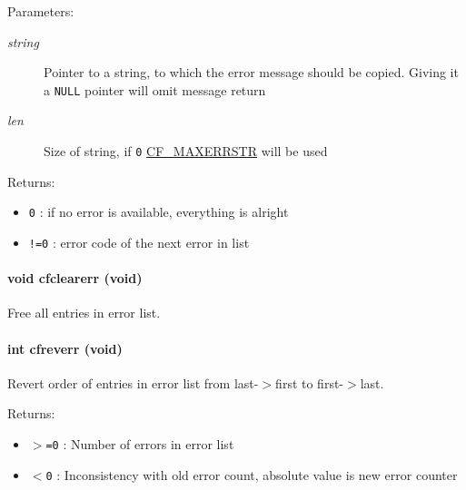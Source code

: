 \begin{Desc}
\item[Parameters:]
\begin{description}
\item[{\em string}]Pointer to a string, to which the error message should be copied. Giving it a {\tt NULL} pointer will omit message return\item[{\em len}]Size of string, if {\tt 0} \hyperlink{group__cflib__core_gf78e4b950c9aa49b752e4460342ea3bf}{CF\_\-MAXERRSTR} will be used\end{description}
\end{Desc}
\begin{Desc}
\item[Returns:]\begin{itemize}
\item {\tt 0} : if no error is available, everything is alright \item {\tt !=0} : error code of the next error in list \end{itemize}
\end{Desc}
\hypertarget{group__errors_gad0c79adfdf363a11532dc4039136ec6}{
\paragraph[{cfclearerr}]{\setlength{\rightskip}{0pt plus 5cm}void cfclearerr (void)}\hfill}
\label{group__errors_gad0c79adfdf363a11532dc4039136ec6}


Free all entries in error list. 

\hypertarget{group__errors_gbc3a143038fbcabc944d224e20ca50f8}{
\paragraph[{cfreverr}]{\setlength{\rightskip}{0pt plus 5cm}int cfreverr (void)}\hfill}
\label{group__errors_gbc3a143038fbcabc944d224e20ca50f8}


Revert order of entries in error list from last-$>$first to first-$>$last. 

\begin{Desc}
\item[Returns:]\begin{itemize}
\item {\tt $>$=0} : Number of errors in error list \item {\tt $<$0} : Inconsistency with old error count, absolute value is new error counter \end{itemize}
\end{Desc}

